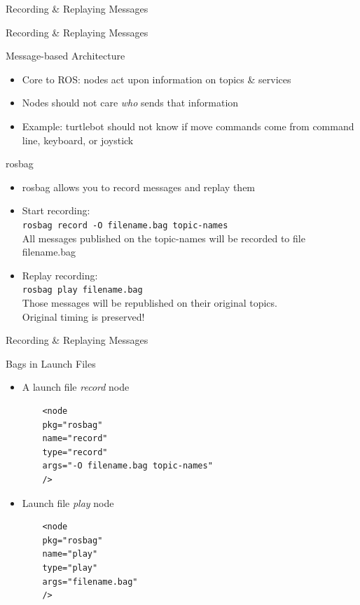 \documentclass[9pt]{beamer}
\begin{document}
\begin{section}{Recording \& Replaying Messages}
    \begin{frame}{Recording \& Replaying Messages}
        \begin{block}{Message-based Architecture}
            \begin{itemize}
                \item Core to ROS: nodes act upon information on topics \& services
                \item Nodes should not care \textit{who} sends that information
                \item Example: turtlebot should not know if move commands come from command line, keyboard, or joystick 
            \end{itemize}
        \end{block}
        \begin{block}{rosbag}
            \begin{itemize}
                \item rosbag allows you to record messages and replay them
                \item Start recording: \\
                \lstinline{rosbag record -O filename.bag topic-names} \\
                All messages published on the topic-names will be recorded to file filename.bag
                \item Replay recording: \\
                \lstinline{rosbag play filename.bag} \\
                Those messages will be republished on their original topics. \\
                Original timing is preserved!
            \end{itemize}
        \end{block}
    \end{frame}
    \begin{frame}[fragile]{Recording \& Replaying Messages}
        \begin{block}{Bags in Launch Files}
            \begin{itemize}
                \item A launch file \textit{record} node
                    \begin{lstlisting}
    <node
    pkg="rosbag"
    name="record"
    type="record"
    args="-O filename.bag topic-names"
    />
                    \end{lstlisting}                
                \item Launch file \textit{play} node
                    \begin{lstlisting}
    <node
    pkg="rosbag"
    name="play"
    type="play"
    args="filename.bag"
    />
                    \end{lstlisting}
            \end{itemize}
        \end{block}
    \end{frame}
    
    
\end{section}
\end{document}
